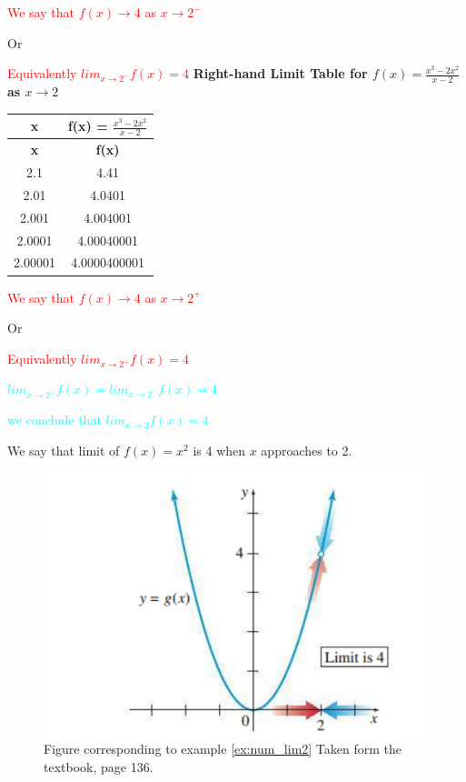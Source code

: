 \textcolor{red}{We say that $f(x) \to 4 $ as $x \to 2^{-}$}

Or

\textcolor{red}{Equivalently $ lim_{x \to 2^{-}}f(x) = 4$}  
\textbf{Right-hand Limit Table for \( f(x) = \frac{x^3 - 2x^2}{x - 2} \) as \( x \to 2 \)}

\begin{longtable}{|c|c|}
\hline
\textbf{x} & \textbf{f(x) = \( \frac{x^3 - 2x^2}{x - 2} \)} \\
\hline
\endfirsthead
\hline
\textbf{x} & \textbf{f(x)} \\
\hline
\endhead
2.1 & 4.41 \\
\hline
2.01 & 4.0401 \\
\hline
2.001 & 4.004001 \\
\hline
2.0001 & 4.00040001 \\
\hline
2.00001 & 4.0000400001 \\
\hline
\end{longtable}

\textcolor{red}{We say that $f(x) \to 4 $ as $x \to 2^{+}$}

Or

\textcolor{red}{Equivalently $ lim_{x \to 2^{+}}f(x) = 4$}  

\textcolor{cyan}{ $ lim_{x \to 2^{+}}f(x) = lim_{x \to 2^{-}}f(x) = 4$}  

\textcolor{cyan}{ we conclude that $ lim_{x \to 2}f(x) =  4$}  

We say that limit of $f(x)=x^{2}$ is 4 when $x$ approaches to 2.


\begin{figure}[H]
  \centering
  \includegraphics[scale=0.5]{"./fig/num_lim_exm_2.png"}
  \caption{\label{fig:fig_label2} Figure corresponding to example \eqref{ex:num_lim2} Taken form the textbook, page 136. }
\end{figure}

